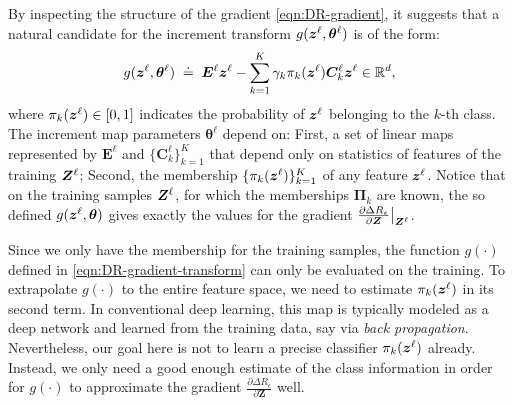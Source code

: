 \documentclass[\toplevelprefix/book-main.tex]{subfiles}
\begin{document}
By inspecting the structure of the gradient \eqref{eqn:DR-gradient}, it suggests that a natural candidate for the increment transform $g(\bm{z}^\ell, \bm \theta^\ell)$ is of the form:
\begin{equation}
    g(\bm{z}^\ell, \bm \theta^\ell) \; \doteq \; \bm E^\ell \bm{z}^\ell - \sum_{k=1}^K \gamma_{k} \pi_k(\bm{z}^\ell)\bm C_{k}^{\ell}  \bm{z}^{\ell}  \in \mathbb{R}^d,
    \label{eqn:DR-gradient-transform}
\end{equation}
where $\pi_k(\bm{z}^\ell) \in [0,1]$ indicates the probability of $\bm{z}^{\ell}$ belonging to the $k$-th class. The increment map parameters $\bm \theta^\ell$ depend on: First, a set of linear maps represented by $\bm E^{\ell}$ and $\{ \bm C^{\ell}_{k}\}_{k=1}^{K}$ that depend only on statistics of features of the training $\bm{Z}^\ell$; Second, the membership $\{ \pi_k(\bm{z}^\ell)\}_{k=1}^K$ of any feature $\bm{z}^\ell$. 
Notice that on the training samples $\bm{Z}^\ell$, for which the memberships $\bm \Pi_k$ are known,  the so defined $g(\bm{z}^\ell, \bm \theta)$ gives exactly the values for the gradient $\frac{\partial \Delta R_{\epsilon}}{\partial \bm Z}\big|_{\bm{Z}^\ell}$.  


Since we only have the membership  for the training samples, the function $g(\cdot)$ defined in \eqref{eqn:DR-gradient-transform} can only be evaluated on the training. To extrapolate $g(\cdot)$ to the entire feature space, we need to estimate $\pi_k(\bm{z}^\ell)$ in its second term. In conventional deep learning, this map is typically modeled as a deep network and learned from the training data, say via {\em back propagation}. Nevertheless, our goal here is not to learn a precise classifier $\pi_{k}(\bm{z}^\ell)$ already. Instead, we only need a good enough estimate of the class information in order for $g(\cdot)$ to approximate the gradient $\frac{\partial \Delta R_{\epsilon}}{\partial \bm Z}$ well. 
\end{document}
